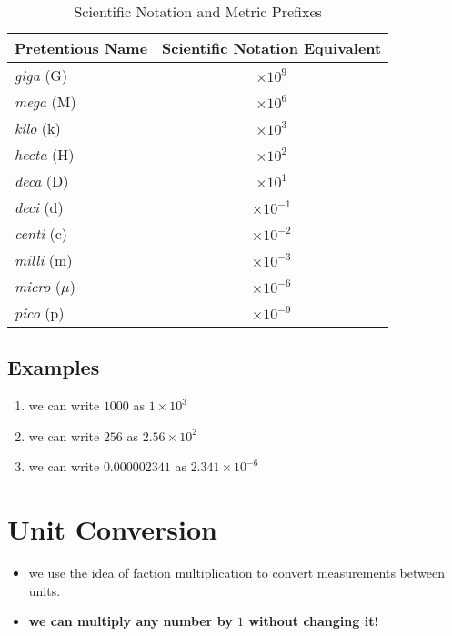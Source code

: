 \documentclass[11pt, oneside]{article}   	%
\begin{document}
\begin{table}
\centering
\begin{tabular}[hbpt]{|l|c|}
\hline
Pretentious Name & Scientific Notation Equivalent \\
\hline
\emph{giga} (G)  & $ \times 10^{9} $   \\
\emph{mega} (M)  & $ \times 10^{6} $   \\
\emph{kilo} (k)      & $ \times 10^{3} $   \\
\emph{hecta} (H)      & $ \times 10^{2} $   \\
\emph{deca} (D)      & $ \times 10^{1} $   \\
\emph{deci} (d)      & $ \times 10^{-1} $   \\
\emph{centi} (c)     & $ \times 10^{-2} $   \\
\emph{milli}  (m)    & $ \times 10^{-3} $  \\
\emph{micro} ($\mu$)  & $ \times 10^{-6} $  \\
\emph{pico}  (p) & $ \times 10^{-9} $  \\
\hline
\end{tabular}
\caption{Scientific Notation and Metric Prefixes}
\end{table}

\subsection{Examples}
\begin{enumerate}[label=Example \arabic*]
\item we can write $1000$ as $1 \times 10^{3}$
\item we can write $256$ as $2.56 \times 10^{2}$
\item we can write $0.000002341$ as $ 2.341 \times 10^{-6} $
\end{enumerate}



\section{Unit Conversion}
\begin{itemize}
\item we use the idea of faction multiplication to convert measurements between units. 
\item \textbf{we can multiply any number by $1$ without changing it!}
\end{itemize}
\end{document}

